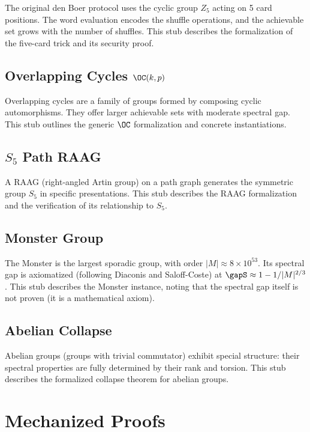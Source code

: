 \documentclass[11pt,a4paper]{article}
\begin{document}
The original den Boer protocol uses the cyclic group $Z_5$ acting on 5 card positions.
The word evaluation encodes the shuffle operations, and the achievable set grows with the number of shuffles.
This stub describes the \Rocq formalization of the five-card trick and its security proof.

\subsection{Overlapping Cycles $\OC(k,p)$}
\label{sec:inst-oc}

Overlapping cycles are a family of groups formed by composing cyclic automorphisms.
They offer larger achievable sets with moderate spectral gap.
This stub outlines the generic $\OC$ formalization and concrete instantiations.

\subsection{$S_5$ Path RAAG}
\label{sec:inst-s5}

A RAAG (right-angled Artin group) on a path graph generates the symmetric group $S_5$ in specific presentations.
This stub describes the RAAG formalization and the verification of its relationship to $S_5$.

\subsection{Monster Group}
\label{sec:inst-monster}

The Monster is the largest sporadic group, with order $|M| \approx 8 \times 10^{53}$.
Its spectral gap is axiomatized (following Diaconis and Saloff-Coste) at $\gapS \approx 1 - 1/|M|^{2/3}$.
This stub describes the Monster instance, noting that the spectral gap itself is not proven (it is a mathematical axiom).

\subsection{Abelian Collapse}
\label{sec:inst-abelian}

Abelian groups (groups with trivial commutator) exhibit special structure: their spectral properties are fully determined by their rank and torsion.
This stub describes the formalized collapse theorem for abelian groups.

\section{Mechanized Proofs}
\label{sec:methodology}
\end{document}
